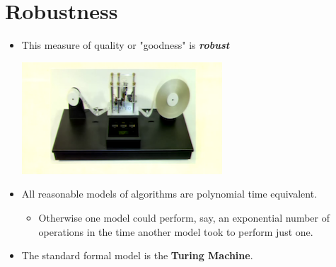 \documentclass[12pt]{article}
\begin{document}
\section{Robustness}
\renewcommand{\labelitemii}{$\circ$}
\renewcommand{\labelitemiii}{$\cdot$}
\renewcommand{\labelitemiii}{$\rightarrow$}
\begin{itemize}
\item This measure of quality or "goodness" is \textbf{\textit{robust}}
	\begin{center}
	\includegraphics{lecture1d}
	\end{center}
\item All reasonable models of algorithms are polynomial time equivalent.
	\begin{itemize}
	\item Otherwise one model could perform, say, an exponential number of operations in the time another model took to perform just one.
	\end{itemize}
\item The standard formal model is the \textbf{Turing Machine}.
\end{itemize}
\end{document}
